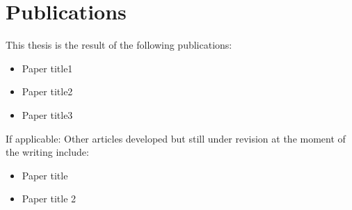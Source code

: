 \begingroup
\let\clearpage\relax
\let\cleardoublepage\relax
\let\cleardoublepage\relax

\manualmark
{} 

\chapter*{Publications}
This thesis is the result of the following publications:
\begin{itemize}
\item Paper title1~\citep{paper1}
\item Paper title2~\citep{paper2}
\item Paper title3~\citep{paper3}
\end{itemize}

If applicable:
Other articles developed but still under revision at the moment of the writing include:
\begin{itemize}
 \item Paper title 
 \item Paper title 2 
\end{itemize}


\endgroup
